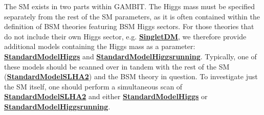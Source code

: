 \documentclass[pdftex,twocolumn,epjc3_preprint,runningheads]{svjour3}
\renewcommand{\_}{\discretionary{\underscore}{}{\underscore}}
\newcommand{\doublecrosssf}[2]{\hyperref[#2]{\textbf{\textsf{#1}}}}
\newcommand{\gambit}{\textsf{GAMBIT}\xspace}
\newcommand{\GB}{\gambit}
\begin{document}
The SM exists in two parts within \GB.  The Higgs mass must be specified separately from the rest of the SM parameters, as it is often contained within the definition of BSM theories featuring BSM Higgs sectors.  For those theories that do not include their own Higgs sector, e.g. \doublecrosssf{SingletDM}{SingletDM}, we therefore provide additional models containing the Higgs mass as a parameter: \doublecrosssf{StandardModel\_Higgs}{SM_h} and \doublecrosssf{StandardModel\_Higgs\_running}{SM_h_run}. Typically, one of these models should be scanned over in tandem with the rest of the SM (\doublecrosssf{StandardModel\_SLHA2}{SM_SLHA2}) and the BSM theory in question.  To investigate just the SM itself, one should perform a simultaneous scan of \doublecrosssf{StandardModel\_SLHA2}{SM_SLHA2} and either \doublecrosssf{StandardModel\_Higgs}{SM_h} or \doublecrosssf{StandardModel\_Higgs\_running}{SM_h_run}.
\end{document}
